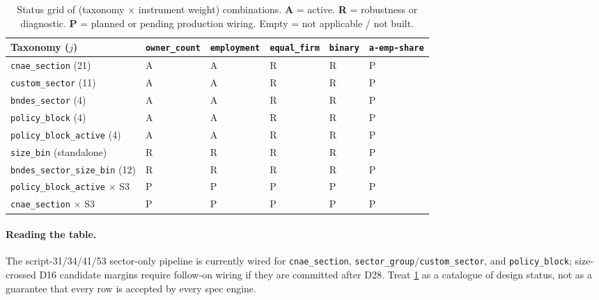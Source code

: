 \documentclass[12pt]{article}
\theoremstyle{definition}
\begin{document}
\begin{table}[h!]
\centering
\caption{Status grid of (taxonomy $\times$ instrument weight) combinations. \textbf{A} = active. \textbf{R} = robustness or diagnostic. \textbf{P} = planned or pending production wiring. Empty = not applicable / not built.}
\label{tab:summary}
\small
\begin{tabularx}{\textwidth}{@{}l *{5}{>{\centering\arraybackslash}X}@{}}
\toprule
\textbf{Taxonomy ($j$)} & \texttt{owner\_count} & \texttt{employment} & \texttt{equal\_firm} & \texttt{binary} & \texttt{a-emp-share}\newline{\small (\cref{sec:aligned-emp-share})}\\
\midrule
\texttt{cnae\_section} (21)             & A & A & R & R & P \\
\texttt{custom\_sector} (11)            & A & A & R & R & P \\
\texttt{bndes\_sector} (4)              & A & A & R & R & P \\
\texttt{policy\_block} (4)              & A & A & R & R & P \\
\texttt{policy\_block\_active} (4)      & A & A & R & R & P \\
\texttt{size\_bin} (standalone)         & R & R & R & R & P \\
\texttt{bndes\_sector\_size\_bin} (12)  & R & R & R & R & P \\
\texttt{policy\_block\_active} $\times$ S3 & P & P & P & P & P \\
\texttt{cnae\_section} $\times$ S3 & P & P & P & P & P \\
\bottomrule
\end{tabularx}
\end{table}

\paragraph{Reading the table.}
The script-31/34/41/53 sector-only pipeline is currently wired for \texttt{cnae\_section}, \texttt{sector\_group}/\texttt{custom\_sector}, and \texttt{policy\_block}; size-crossed D16 candidate margins require follow-on wiring if they are committed after D28. Treat \cref{tab:summary} as a catalogue of design status, not as a guarantee that every row is accepted by every spec engine.
\end{document}
